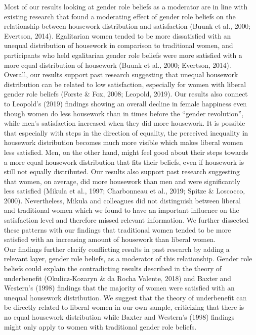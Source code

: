 \documentclass[
  man,floatsintext]{apa6}
\begin{document}
Most of our results looking at gender role beliefs as a moderator are in line with existing research that found a moderating effect of gender role beliefs on the relationship between housework distribution and satisfaction (Buunk et al., 2000; Evertson, 2014). Egalitarian women tended to be more dissatisfied with an unequal distribution of housework in comparison to traditional women, and participants who held egalitarian gender role beliefs were more satisfied with a more equal distribution of housework (Buunk et al., 2000; Evertson, 2014). Overall, our results support past research suggesting that unequal housework distribution can be related to low satisfaction, especially for women with liberal gender role beliefs (Forste \& Fox, 2008; Leopold, 2019). Our results also connect to Leopold's (2019) findings showing an overall decline in female happiness even though women do less housework than in times before the ``gender revolution'', while men's satisfaction increased when they did more housework. It is possible that especially with steps in the direction of equality, the perceived inequality in housework distribution becomes much more visible which makes liberal women less satisfied. Men, on the other hand, might feel good about their steps towards a more equal housework distribution that fits their beliefs, even if housework is still not equally distributed.
Our results also support past research suggesting that women, on average, did more housework than men and were significantly less satisfied (Mikula et al., 1997; Charbonneau et al., 2019; Spitze \& Loscocco, 2000). Nevertheless, Mikula and colleagues did not distinguish between liberal and traditional women which we found to have an important influence on the satisfaction level and therefore missed relevant information. We further dissected these patterns with our findings that traditional women tended to be more satisfied with an increasing amount of housework than liberal women.\\
Our findings further clarify conflicting results in past research by adding a relevant layer, gender role beliefs, as a moderator of this relationship. Gender role beliefs could explain the contradicting results described in the theory of underbenefit (Okulicz-Kozaryn \& da Rocha Valente, 2018) and Baxter and Western's (1998) findings that the majority of women were satisfied with an unequal housework distribution. We suggest that the theory of underbenefit can be directly related to liberal women in our own sample, criticizing that there is no equal housework distribution while Baxter and Western's (1998) findings might only apply to women with traditional gender role beliefs.
\end{document}
